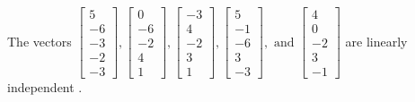 \begin{exercise}
\begin{exerciseStatement}
  \end{exerciseStatement}
  \begin{exerciseAnswer}
   The vectors \(\left[\begin{array}{r}
5 \\
-6 \\
-3 \\
-2 \\
-3
\end{array}\right] , \left[\begin{array}{r}
0 \\
-6 \\
-2 \\
4 \\
1
\end{array}\right] , \left[\begin{array}{r}
-3 \\
4 \\
-2 \\
3 \\
1
\end{array}\right] , \left[\begin{array}{r}
5 \\
-1 \\
-6 \\
3 \\
-3
\end{array}\right] , \text{ and } \left[\begin{array}{r}
4 \\
0 \\
-2 \\
3 \\
-1
\end{array}\right]\) are 
  	 linearly independent  .
  


  \end{exerciseAnswer}
\end{exercise}